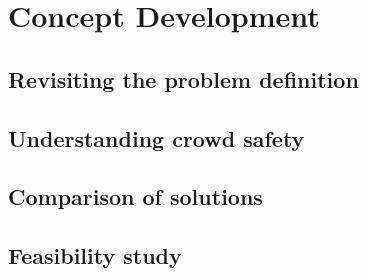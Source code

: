 \chapter{Concept Development}

\section{Revisiting the problem definition}

\section{Understanding crowd safety}

\section{Comparison of solutions}

\section{Feasibility study}
